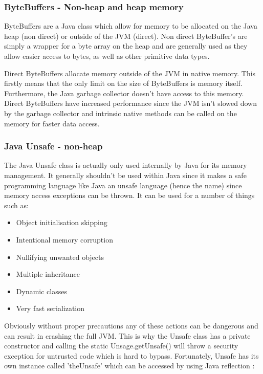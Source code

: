\documentclass[final_report.tex]{subfiles}
\begin{document}
\subsubsection{ByteBuffers - Non-heap and heap memory}
ByteBuffers are a Java class which allow for memory to be allocated on the Java heap (non direct) or outside of the JVM (direct). Non direct ByteBuffer's are simply a wrapper for a byte array on the heap and are generally used as they allow easier access to bytes, as well as other primitive data types.

Direct ByteBuffers allocate memory outside of the JVM in native memory. This firstly means that the only limit on the size of ByteBuffers is memory itself. Furthermore, the Java garbage collector doesn't have access to this memory. Direct ByteBuffers have increased performance since the JVM isn't slowed down by the garbage collector and intrinsic native methods can be called on the memory for faster data access.

\subsubsection{Java Unsafe - non-heap}
The Java Unsafe class is actually only used internally by Java for its memory management. It generally shouldn't be used within Java since it makes a safe programming language like Java an unsafe language (hence the name) since memory access exceptions can be thrown. It can be used for a number of things such as:

\begin{itemize}
	\item Object initialisation skipping
	\item Intentional memory corruption
	\item Nullifying unwanted objects
	\item Multiple inheritance
	\item Dynamic classes
	\item Very fast serialization
\end{itemize}

Obviously without proper precautions any of these actions can be dangerous and can result in crashing the full JVM. This is why the Unsafe class has a private constructor and calling the static Unsage.getUnsafe() will throw a security exception for untrusted code which is hard to bypass. Fortunately, Unsafe has its own instance called 'theUnsafe' which can be accessed by using Java reflection :
\end{document}

